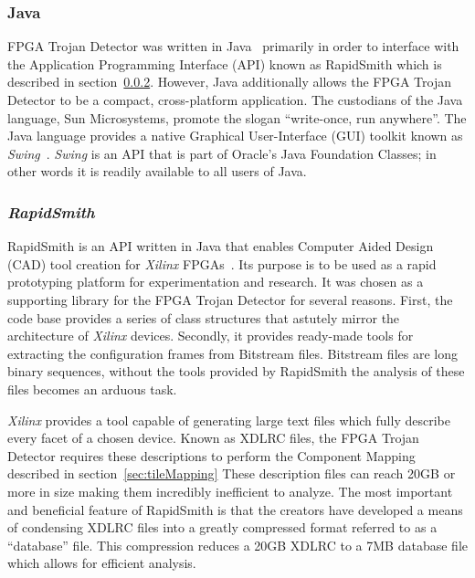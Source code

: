 \documentclass[journal, hidelinks]{IEEEtran}
\begin{document}
\subsubsection{Java} \label{sec:java}
FPGA Trojan Detector was written in Java~\cite{java} primarily in order to interface with the Application Programming Interface (API) known as RapidSmith which is described in section~\ref{sec:rapidSmith}.
However, Java additionally allows the FPGA Trojan Detector to be a compact, cross-platform application.
The custodians of the Java language, Sun Microsystems, promote the slogan ``write-once, run anywhere''. 
The Java language provides a native Graphical User-Interface (GUI) toolkit known as \textit{Swing}~\cite{swing}.
\textit{Swing} is an API that is part of Oracle's Java Foundation Classes; in other words it is readily available to all users of Java.

\subsubsection{\textit{RapidSmith}} \label{sec:rapidSmith}
RapidSmith is an API written in Java that enables Computer Aided Design (CAD) tool creation for \textit{Xilinx} FPGAs~\cite{rapidSmith}.
Its purpose is to be used as a rapid prototyping platform for experimentation and research.
It was chosen as a supporting library for the FPGA Trojan Detector for several reasons.
First, the code base provides a series of class structures that astutely mirror the architecture of \textit{Xilinx} devices.
Secondly, it provides ready-made tools for extracting the configuration frames from Bitstream files. 
Bitstream files are long binary sequences, without the tools provided by RapidSmith the analysis of these files becomes an arduous task.

\textit{Xilinx} provides a tool capable of generating large text files which fully describe every facet of a chosen device.
Known as XDLRC files, the FPGA Trojan Detector requires these descriptions to perform the Component Mapping described in section~\ref{sec:tileMapping}
These description files can reach 20GB or more in size making them incredibly inefficient to analyze.
The most important and beneficial feature of RapidSmith is that the creators have developed a means of condensing XDLRC files into a greatly compressed format referred to as a ``database'' file.
This compression reduces a 20GB XDLRC to a 7MB database file which allows for efficient analysis.

\end{document}
